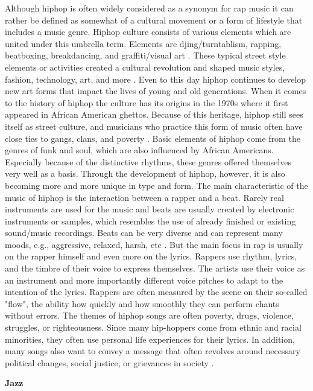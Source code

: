 Although hiphop is often widely considered as a synonym for rap music it can rather be defined as somewhat
of a cultural movement or a form of lifestyle that includes a music genre.
Hiphop culture consists of various elements which are united under this umbrella term.
Elements are djing/turntablism, rapping, beatboxing, breakdancing, and graffiti/visual art \cite{MusicalDictHipHop}.
These typical street style elements or activities created a cultural revolution and shaped music styles,
fashion, technology, art, and more \cite{TateHipHop}.
Even to this day hiphop continues to develop new art forms that impact the lives of young and old generations.
When it comes to the history of hiphop the culture has its origins in the 1970s where it first appeared
in African American ghettos.
Because of this heritage, hiphop still sees itself as street culture, and musicians who practice
this form of music often have close ties to gangs, clans, and poverty \cite{Rory2019}.
Basic elements of hiphop come from the genres of funk and soul, which are also influenced by
African Americans.
Especially because of the distinctive rhythms, these genres offered themselves very well as a basis.
Through the development of hiphop, however, it is also becoming more and more unique in type and form.
The main characteristic of the music of hiphop is the interaction between a rapper and a beat.
Rarely real instruments are used for the music and beats are usually created by electronic
instruments or samples, which resembles the use of already finished or existing sound/music recordings.
Beats can be very diverse and can represent many moods, e.g., aggressive, relaxed, harsh, etc \cite{MusicalDictHipHop}.
But the main focus in rap is usually on the rapper himself and even more on the lyrics.
Rappers use rhythm, lyrics, and the timbre of their voice to express themselves.
The artists use their voice as an instrument and more importantly different voice pitches
to adapt to the intention of the lyrics.
Rappers are often measured by the scene on their so-called "flow",
the ability how quickly and how smoothly they can perform chants without errors.
The themes of hiphop songs are often poverty, drugs, violence, struggles, or righteousness.
Since many hip-hoppers come from ethnic and racial minorities, they often use personal life
experiences for their lyrics.
In addition, many songs also want to convey a message that often revolves around necessary
political changes, social justice, or grievances in society \cite{Goodrich2017}.

\textbf{Jazz}

